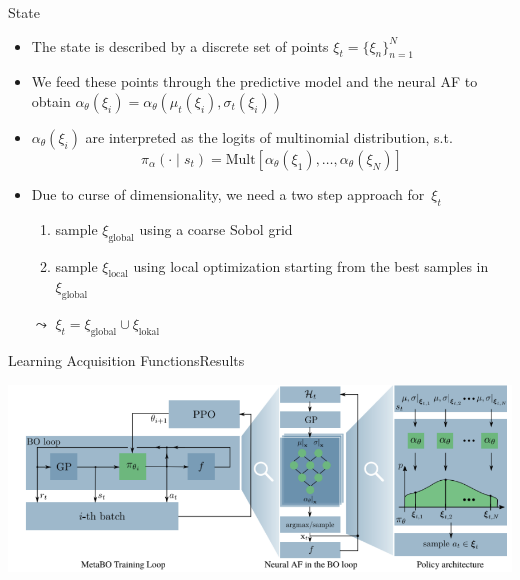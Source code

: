 \begin{frame}[c]{State }

\begin{itemize}
	\item The state is described by a discrete set of points $\xi_t = \{\xi_n\}^N_{n=1}$
	\pause
	\item We feed these points through the predictive model and the neural AF to obtain $\alpha_\theta(\xi_i) = \alpha_\theta(\mu_t(\xi_i), \sigma_t(\xi_i)) $
	\pause
	\item $\alpha_\theta(\xi_i)$ are interpreted as the logits of multinomial distribution, s.t.
	$$\pi_\alpha(\cdot \mid s_t) = \text{Mult}\left[\alpha_\theta(\xi_1), \ldots, \alpha_\theta(\xi_N) \right] $$
	\pause
	\item Due to curse of dimensionality, we need a two step approach for~$\xi_t$
	\begin{enumerate}
		\item sample $\xi_{\text{global}}$ using a coarse Sobol grid
		\item sample $\xi_{\text{local}}$ using local optimization starting from the best samples in $\xi_{\text{global}}$
	\end{enumerate}
	\item[$\leadsto$] $\xi_t = \xi_{\text{global}} \cup \xi_{\text{lokal}}$ 
\end{itemize}

\end{frame}
\begin{frame}[c,fragile]{Learning Acquisition Functions\newline Results }

\centering
\includegraphics[width=1.0\textwidth]{images/l2acq.png}


\end{frame}
